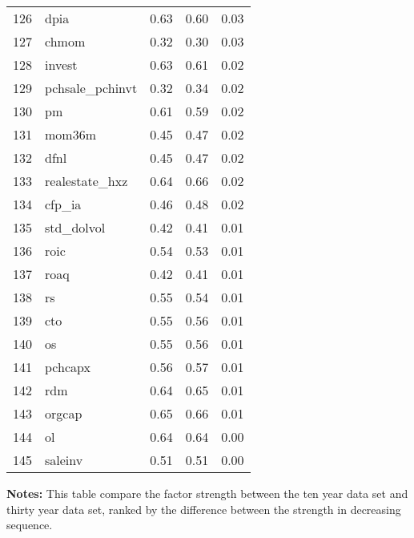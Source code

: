 \documentclass[12pt]{article}
\begin{document}
\begin{footnotesize}
\begin{longtable}{rl|c|c|c}
  126 & dpia & 0.63 & 0.60 & 0.03 \\ 
  127 & chmom & 0.32 & 0.30 & 0.03 \\ 
  128 & invest & 0.63 & 0.61 & 0.02 \\ 
  129 & pchsale\_pchinvt & 0.32 & 0.34 & 0.02 \\ 
  130 & pm & 0.61 & 0.59 & 0.02 \\ 
  131 & mom36m & 0.45 & 0.47 & 0.02 \\ 
  132 & dfnl & 0.45 & 0.47 & 0.02 \\ 
  133 & realestate\_hxz & 0.64 & 0.66 & 0.02 \\ 
  134 & cfp\_ia & 0.46 & 0.48 & 0.02 \\ 
  135 & std\_dolvol & 0.42 & 0.41 & 0.01 \\ 
  136 & roic & 0.54 & 0.53 & 0.01 \\ 
  137 & roaq & 0.42 & 0.41 & 0.01 \\ 
  138 & rs & 0.55 & 0.54 & 0.01 \\ 
  139 & cto & 0.55 & 0.56 & 0.01 \\ 
  140 & os & 0.55 & 0.56 & 0.01 \\ 
  141 & pchcapx & 0.56 & 0.57 & 0.01 \\ 
  142 & rdm & 0.64 & 0.65 & 0.01 \\ 
  143 & orgcap & 0.65 & 0.66 & 0.01 \\ 
  144 & ol & 0.64 & 0.64 & 0.00 \\ 
  145 & saleinv & 0.51 & 0.51 & 0.00 \\ 
   \hline
		
	\end{longtable}
{\bf Notes:}
This table compare the factor strength between the ten year data set and thirty year data set, ranked by the difference between the strength in decreasing sequence.
\end{footnotesize}




\newpage
\end{document}
